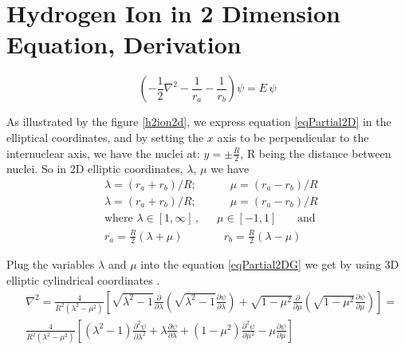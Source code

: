 \chapter{ Hydrogen Ion in 2 Dimension Equation, Derivation }
\label{AppendixC}

\begin{equation}\label{eqPartial2DG}
\left(-\frac{1}{2}\nabla^2-\frac{1}{r_a}-\frac{1}{r_b}\right)\psi = E\,\psi
\end{equation}

As illustrated by the figure \ref{h2ion2d}, we express equation \eqref{eqPartial2D} in the elliptical coordinates, and by setting the $ x $ axis to be perpendicular to the internuclear axis, we have the nuclei at: $ y = \pm \frac{R}{2}  $, R being the distance between nuclei. So in  2D elliptic coordinates, $ \lambda $, $ \mu $ we have 
\begin{equation}\label{variables1G}
\begin{split}
& \lambda = \left(r_a + r_b\right)/R;\,\,\,\,\,\,\,\,\,\,\,\,\,\,\,\,\,\,\mu =  \left(r_a - r_b\right)/R  \\[1em]
& \lambda = \left(r_a + r_b\right)/R;\,\,\,\,\,\,\,\,\,\,\,\,\,\,\,\,\,\,\mu =  \left(r_a - r_b\right)/R  \\[1em]
& \text{where } \lambda \in \left[1,\infty\right]\,,\,\,\,\,\,\,\,\,\,\mu \in \left[ -1, 1 \right]\,\,\,\,\,\,\,\,\,\text{ and } \\[.8em] 
& r_a = \frac{R}{2}\left(\lambda + \mu \right)\,\,\,\,\,\,\,\,\,\,\,\,\,\,\,\,\,\,\,\,\,\, r_b = \frac{R}{2}\left(\lambda - \mu \right)
\end{split}
\end{equation}

Plug the variables $ \lambda $ and $ \mu $ into the equation \eqref{eqPartial2DG} we get by using 3D elliptic cylindrical coordinates \cite{MorseFeshbach} .
\begin{equation}
\begin{split}
& \nabla^2 = \frac{4}{ R^2 (\lambda^2-\mu^2) }\left[ \sqrt{\lambda^2-1}\frac{\partial}{\partial \lambda}\left(\sqrt{\lambda^2-1}\frac{\partial \psi}{\partial \lambda} \right) + 
\sqrt{1-\mu^2}\frac{\partial}{\partial \mu}\left(\sqrt{1 - \mu^2}\frac{\partial \psi }{\partial \mu }\right) \right] = \\
& \frac{4}{ R^2 (\lambda^2-\mu^2) }\left[(\lambda^2-1)\frac{\partial^2 \psi}{\partial \lambda^2} + \lambda\frac{\partial \psi}{\partial \lambda} + (
1 - \mu^2)\frac{\partial^2 \psi}{\partial \mu^2} - \mu\frac{\partial \psi}{\partial \mu} \right]
\end{split}
\end{equation}

